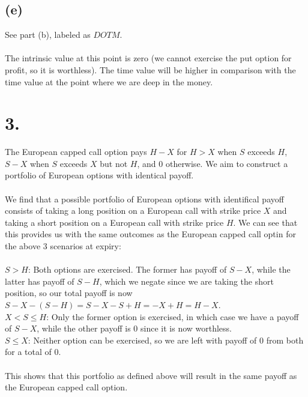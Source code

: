 \documentclass{article}
\begin{document}
{\subsection*{(e)}

See part (b), labeled as $DOTM$. \\ \\
The intrinsic value at this point is zero (we cannot exercise the put option for profit, so it is worthless). 
The time value will be higher in comparison with the time value at the point where we are deep in the money. 

}

\section*{3.}
{\Large 

The European capped call option pays $H - X$ for $H > X$ when $S$ exceeds $H$, $S - X$ when $S$ exceeds $X$ but not $H$, and 0 otherwise. We aim to construct a portfolio of European options with identical payoff. \\ \\
We find that a possible portfolio of European options with identifical payoff consists of taking a long position on a European call with strike price $X$ and taking a short position on a European call with strike price $H$. We can see that this provides us with the same outcomes as the European capped call optin for the above 3 scenarios at expiry: \\ \\ 
$S > H$: Both options are exercised. The former has payoff of $S - X$, while the latter has payoff of $S - H$, which we negate since we are taking the short position, so our total payoff is now $S - X - (S - H) = S - X - S + H = -X + H = H - X$. \\
$X < S \leq H$: Only the former option is exercised, in which case we have a payoff of $S - X$, while the other payoff is 0 since it is now worthless. \\
$S \leq X$: Neither option can be exercised, so we are left with payoff of 0 from both for a total of 0. \\ \\
This shows that this portfolio as defined above will result in the same payoff as the European capped call option.

}
\end{document}
